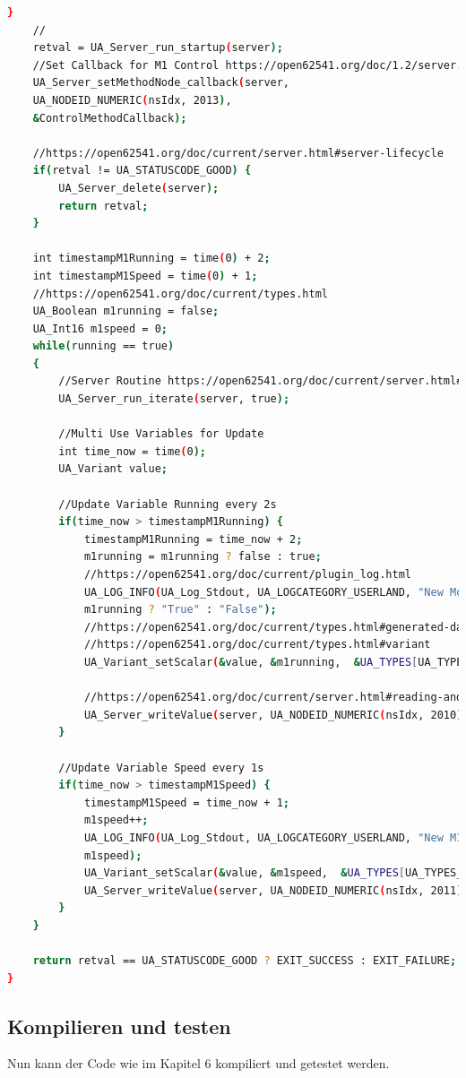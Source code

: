 \begin{lstlisting}[language=Bash]
	}
	//
	retval = UA_Server_run_startup(server);
	//Set Callback for M1 Control https://open62541.org/doc/1.2/server.html#method-callbacks
	UA_Server_setMethodNode_callback(server,
	UA_NODEID_NUMERIC(nsIdx, 2013),
	&ControlMethodCallback);
	
	//https://open62541.org/doc/current/server.html#server-lifecycle
	if(retval != UA_STATUSCODE_GOOD) {
		UA_Server_delete(server);
		return retval;
	}
	
	int timestampM1Running = time(0) + 2;
	int timestampM1Speed = time(0) + 1;
	//https://open62541.org/doc/current/types.html
	UA_Boolean m1running = false;
	UA_Int16 m1speed = 0;
	while(running == true)
	{
		//Server Routine https://open62541.org/doc/current/server.html#server-lifecycle
		UA_Server_run_iterate(server, true);
		
		//Multi Use Variables for Update
		int time_now = time(0);
		UA_Variant value;
		
		//Update Variable Running every 2s
		if(time_now > timestampM1Running) {
			timestampM1Running = time_now + 2;
			m1running = m1running ? false : true;
			//https://open62541.org/doc/current/plugin_log.html
			UA_LOG_INFO(UA_Log_Stdout, UA_LOGCATEGORY_USERLAND, "New Motor 1 Running Bool: %s",
			m1running ? "True" : "False");
			//https://open62541.org/doc/current/types.html#generated-data-type-definitions
			//https://open62541.org/doc/current/types.html#variant
			UA_Variant_setScalar(&value, &m1running,  &UA_TYPES[UA_TYPES_BOOLEAN]);
			
			//https://open62541.org/doc/current/server.html#reading-and-writing-node-attributes
			UA_Server_writeValue(server, UA_NODEID_NUMERIC(nsIdx, 2010), value);
		}
		
		//Update Variable Speed every 1s
		if(time_now > timestampM1Speed) {
			timestampM1Speed = time_now + 1;
			m1speed++;
			UA_LOG_INFO(UA_Log_Stdout, UA_LOGCATEGORY_USERLAND, "New M1 Speed int: %d",
			m1speed);
			UA_Variant_setScalar(&value, &m1speed,  &UA_TYPES[UA_TYPES_INT16]);
			UA_Server_writeValue(server, UA_NODEID_NUMERIC(nsIdx, 2011), value);
		}
	}
	
	return retval == UA_STATUSCODE_GOOD ? EXIT_SUCCESS : EXIT_FAILURE;
}
\end{lstlisting}

\subsection{Kompilieren und testen}
Nun kann der Code wie im Kapitel 6 kompiliert und getestet werden.

